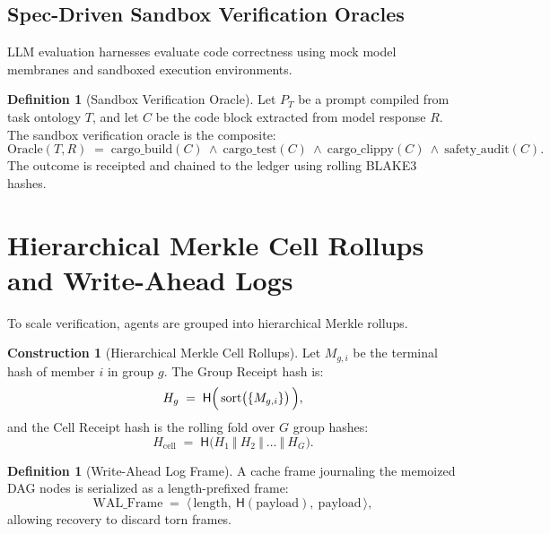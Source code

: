 \documentclass[11pt,a4paper]{article}
\theoremstyle{definition}
\newtheorem{definition}[theorem]{Definition}
\newtheorem{construction}[theorem]{Construction}
\theoremstyle{remark}
\newcommand{\chainH}{\mathsf{H}}
\begin{document}
\subsection{Spec-Driven Sandbox Verification Oracles}

LLM evaluation harnesses evaluate code correctness using mock model membranes and sandboxed execution environments.

\begin{definition}[Sandbox Verification Oracle]\label{def:sandbox}
Let $P_T$ be a prompt compiled from task ontology $T$, and let $C$ be the code block extracted from model response $R$. The sandbox verification oracle is the composite:
\begin{equation}\label{eq:sandbox}
\text{Oracle}(T, R)\;=\;\text{cargo\_build}(C) \ \land\ \text{cargo\_test}(C) \ \land\ \text{cargo\_clippy}(C) \ \land\ \text{safety\_audit}(C).
\end{equation}
The outcome is receipted and chained to the ledger using rolling BLAKE3 hashes.
\end{definition}

\section{Hierarchical Merkle Cell Rollups and Write-Ahead Logs}

To scale verification, agents are grouped into hierarchical Merkle rollups.

\begin{construction}[Hierarchical Merkle Cell Rollups]\label{con:merklecell}
Let $M_{g,i}$ be the terminal hash of member $i$ in group $g$. The Group Receipt hash is:
\begin{equation}\label{eq:groupreceipt}
H_g \;=\; \chainH\Bigl(\,\text{sort}\bigl(\{ M_{g,i} \}\bigr)\,\Bigr),
\end{equation}
and the Cell Receipt hash is the rolling fold over $G$ group hashes:
\[
H_{\text{cell}}\;=\;\chainH\bigl(H_1\ \Vert\ H_2\ \Vert\ \dots\ \Vert\ H_G\bigr).
\]
\end{construction}

\begin{definition}[Write-Ahead Log Frame]\label{def:walframe}
A cache frame journaling the memoized DAG nodes is serialized as a length-prefixed frame:
\begin{equation}\label{eq:walframe}
\text{WAL\_Frame}\;=\;\langle\,\text{length},\ \chainH(\text{payload}),\ \text{payload}\,\rangle,
\end{equation}
allowing recovery to discard torn frames.
\end{definition}
\end{document}
